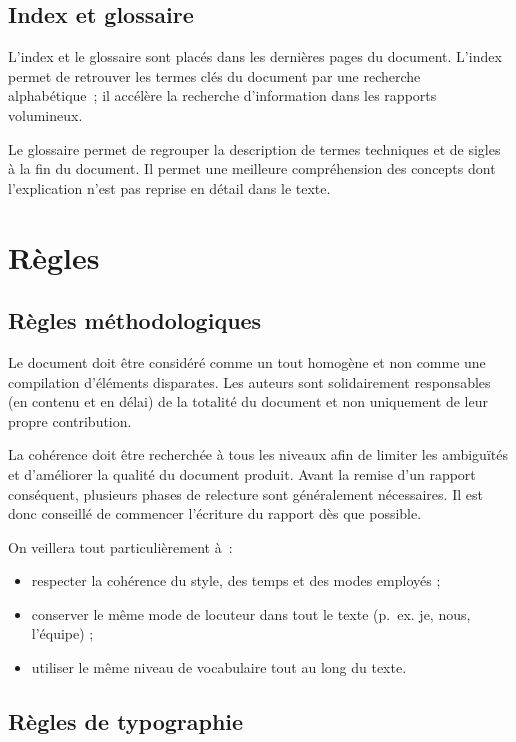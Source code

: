 \subsection{Index et glossaire}

L'index et le glossaire sont placés dans les dernières pages du
document. L'index permet de retrouver les termes clés du document par une
recherche alphabétique~; il accélère la recherche d'information dans les
rapports volumineux.

Le glossaire permet de regrouper la description de termes techniques et de
sigles à la fin du document. Il permet une meilleure compréhension des
concepts dont l'explication n'est pas reprise en détail dans le texte.

\section{Règles}
\label{sec:regles}

\subsection{Règles méthodologiques}

Le document doit être considéré comme un tout homogène et non comme
une compilation d'éléments disparates. Les auteurs sont solidairement
responsables (en contenu et en délai) de la totalité du document et
non uniquement de leur propre contribution.

La cohérence doit être recherchée à tous les niveaux afin de limiter
les ambiguïtés et d'améliorer la qualité du document produit. Avant la remise
d'un rapport conséquent, plusieurs phases de relecture sont généralement
nécessaires. Il est donc conseillé de commencer l'écriture du rapport dès que
possible. 

On veillera tout particulièrement à~:
\begin{itemize}
\item respecter la cohérence du style, des  temps et des modes employés ;
\item conserver le même mode de locuteur dans tout le texte (p.~ex.
  je, nous, l'équipe) ;
\item utiliser le même niveau de vocabulaire tout au long du texte. 
\end{itemize}

\subsection{Règles de typographie}

